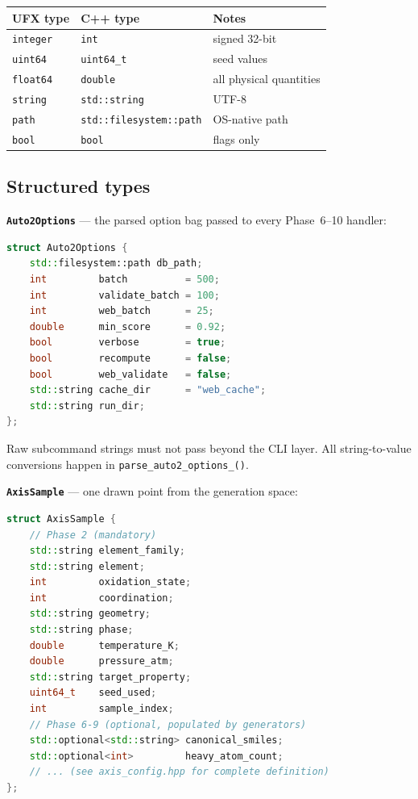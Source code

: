 \documentclass[11pt,letterpaper]{article}
\begin{document}
\begin{center}
\begin{tabular}{lll}
\toprule
UFX type & C++ type & Notes \\
\midrule
\texttt{integer}   & \texttt{int}                    & signed 32-bit \\
\texttt{uint64}    & \texttt{uint64\_t}              & seed values \\
\texttt{float64}   & \texttt{double}                 & all physical quantities \\
\texttt{string}    & \texttt{std::string}            & UTF-8 \\
\texttt{path}      & \texttt{std::filesystem::path}  & OS-native path \\
\texttt{bool}      & \texttt{bool}                   & flags only \\
\bottomrule
\end{tabular}
\end{center}

\subsection{Structured types}

\textbf{\texttt{Auto2Options}} --- the parsed option bag passed to every
Phase~6--10 handler:

\begin{lstlisting}[language=C++]
struct Auto2Options {
	std::filesystem::path db_path;
	int         batch          = 500;
	int         validate_batch = 100;
	int         web_batch      = 25;
	double      min_score      = 0.92;
	bool        verbose        = true;
	bool        recompute      = false;
	bool        web_validate   = false;
	std::string cache_dir      = "web_cache";
	std::string run_dir;
};
\end{lstlisting}

Raw subcommand strings must not pass beyond the CLI layer.  All
string-to-value conversions happen in \texttt{parse\_auto2\_options\_()}.

\textbf{\texttt{AxisSample}} --- one drawn point from the generation space:

\begin{lstlisting}[language=C++]
struct AxisSample {
	// Phase 2 (mandatory)
	std::string element_family;
	std::string element;
	int         oxidation_state;
	int         coordination;
	std::string geometry;
	std::string phase;
	double      temperature_K;
	double      pressure_atm;
	std::string target_property;
	uint64_t    seed_used;
	int         sample_index;
	// Phase 6-9 (optional, populated by generators)
	std::optional<std::string> canonical_smiles;
	std::optional<int>         heavy_atom_count;
	// ... (see axis_config.hpp for complete definition)
};
\end{lstlisting}
\end{document}
